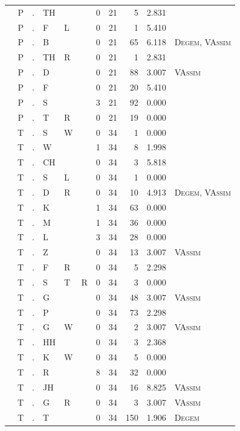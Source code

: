\documentclass[12pt]{article}
\begin{document}
\begin{longtable}{r@{ } r@{ } c@{ } l@{ } l@{ } l@{ } r r r r l }
 & P & . & TH &  &  & 0 & 21 & 5 & 2.831 &  \\
 & P & . & F & L &  & 0 & 21 & 1 & 5.410 &  \\
 & P & . & B &  &  & 0 & 21 & 65 & 6.118 & \textsc{Degem}, \textsc{VAssim} \\
 & P & . & TH & R &  & 0 & 21 & 1 & 2.831 &  \\
 & P & . & D &  &  & 0 & 21 & 88 & 3.007 & \textsc{VAssim} \\
 & P & . & F &  &  & 0 & 21 & 20 & 5.410 &  \\
 & P & . & S &  &  & 3 & 21 & 92 & 0.000 &  \\
 & P & . & T & R &  & 0 & 21 & 19 & 0.000 &  \\
 & T & . & S & W &  & 0 & 34 & 1 & 0.000 &  \\
 & T & . & W &  &  & 1 & 34 & 8 & 1.998 &  \\
 & T & . & CH &  &  & 0 & 34 & 3 & 5.818 &  \\
 & T & . & S & L &  & 0 & 34 & 1 & 0.000 &  \\
 & T & . & D & R &  & 0 & 34 & 10 & 4.913 & \textsc{Degem}, \textsc{VAssim} \\
 & T & . & K &  &  & 1 & 34 & 63 & 0.000 &  \\
 & T & . & M &  &  & 1 & 34 & 36 & 0.000 &  \\
 & T & . & L &  &  & 3 & 34 & 28 & 0.000 &  \\
 & T & . & Z &  &  & 0 & 34 & 13 & 3.007 & \textsc{VAssim} \\
 & T & . & F & R &  & 0 & 34 & 5 & 2.298 &  \\
 & T & . & S & T & R & 0 & 34 & 3 & 0.000 &  \\
 & T & . & G &  &  & 0 & 34 & 48 & 3.007 & \textsc{VAssim} \\
 & T & . & P &  &  & 0 & 34 & 73 & 2.298 &  \\
 & T & . & G & W &  & 0 & 34 & 2 & 3.007 & \textsc{VAssim} \\
 & T & . & HH &  &  & 0 & 34 & 3 & 2.368 &  \\
 & T & . & K & W &  & 0 & 34 & 5 & 0.000 &  \\
 & T & . & R &  &  & 8 & 34 & 32 & 0.000 &  \\
 & T & . & JH &  &  & 0 & 34 & 16 & 8.825 & \textsc{VAssim} \\
 & T & . & G & R &  & 0 & 34 & 3 & 3.007 & \textsc{VAssim} \\
 & T & . & T &  &  & 0 & 34 & 150 & 1.906 & \textsc{Degem} \\

\end{longtable}
\end{document}
